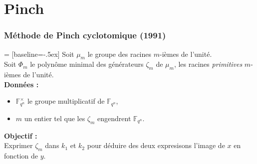 \documentclass{beamer} %
\numberwithin{equation}{section}
\newcommand\GF[1]{\mathbb{F}_{#1}}
\begin{document}
\section{Pinch}
\begin{frame}
\frametitle{Méthode de Pinch cyclotomique (1991)}
 = [baseline=-.5ex]
Soit $\mu_m$ le groupe des racines $m$-ièmes de l'unité.\\
Soit $\Phi_m$ le polynôme minimal des générateurs $\zeta_m$ de $\mu_m$, les 
racines \emph{primitives} $m$-ièmes de l'unité.\\
\vspace{0.3cm}
\textbf{Données :}
\begin{itemize}
	\item $\GF{q^n}^{\times}$ le groupe multiplicatif de $\GF{q^n}$,
	\item $m$ un entier tel que les $\zeta_m$ engendrent $\GF{q^n}$.
\end{itemize}
\vspace{0.3cm}
\textbf{Objectif :}\\
Exprimer $\zeta_m$ dans $k_1$ et $k_2$ pour déduire des deux expresisons l'image
de $x$ en fonction de $y$.
\end{frame}
\end{document}
